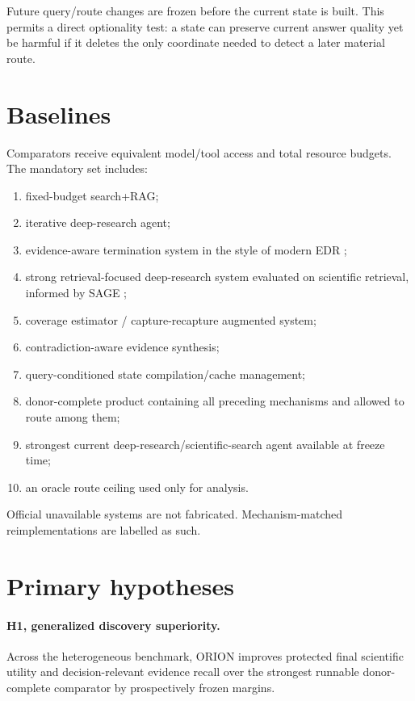 \documentclass[11pt]{article}
\begin{document}
Future query/route changes are frozen before the current state is built. This permits a direct optionality test: a state can preserve current answer quality yet be harmful if it deletes the only coordinate needed to detect a later material route.

\section{Baselines}
Comparators receive equivalent model/tool access and total resource budgets. The mandatory set includes:
\begin{enumerate}
    \item fixed-budget search+RAG;
    \item iterative deep-research agent;
    \item evidence-aware termination system in the style of modern EDR \cite{dontstopearly2026};
    \item strong retrieval-focused deep-research system evaluated on scientific retrieval, informed by SAGE \cite{sage2026};
    \item coverage estimator / capture-recapture augmented system;
    \item contradiction-aware evidence synthesis;
    \item query-conditioned state compilation/cache management;
    \item donor-complete product containing all preceding mechanisms and allowed to route among them;
    \item strongest current deep-research/scientific-search agent available at freeze time;
    \item an oracle route ceiling used only for analysis.
\end{enumerate}
Official unavailable systems are not fabricated. Mechanism-matched reimplementations are labelled as such.

\section{Primary hypotheses}
\paragraph{H1, generalized discovery superiority.}
Across the heterogeneous benchmark, ORION improves protected final scientific utility and decision-relevant evidence recall over the strongest runnable donor-complete comparator by prospectively frozen margins.
\end{document}
